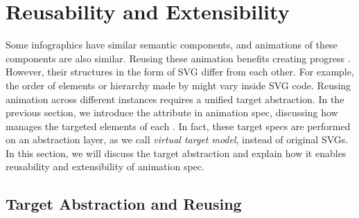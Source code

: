 \section{Reusability and Extensibility}
\label{sec:gaia_reuse}


Some infographics have similar semantic components, and animations of these components are also similar.
Reusing these animation benefits creating progress \cite{thompson2020understanding}.
However, their structures in the form of SVG differ from each other.
For example, the order of elements or hierarchy made by  might vary inside SVG code. 
Reusing animation across different instances requires a unified target abstraction.
In the previous section, we introduce the attribute  in animation spec, discussing how \gaia{} manages the targeted elements of each \aniunit{}.
In fact, these target specs are performed on an abstraction layer, as we call \textit{virtual target model}, instead of original SVGs.
In this section, we will discuss the target abstraction and explain how it enables reusability and extensibility of \gaia{} animation spec.

\subsection{Target Abstraction and Reusing}
\label{sec:target_type}

